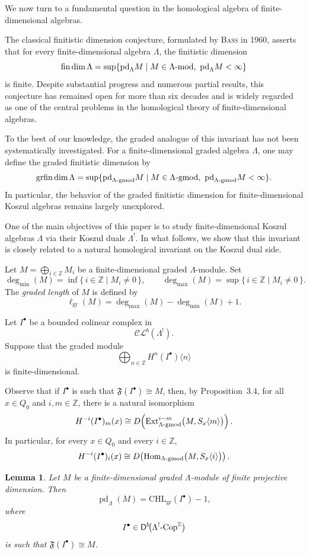 \documentclass[11pt]{article}
\newtheorem{lemma}[theorem]{Lemma}
\theoremstyle{definition}
\theoremstyle{remark}
\begin{document}
We now turn to a fundamental question in the homological algebra of finite-dimensional algebras. 

The classical finitistic dimension conjecture, formulated by \textsc{Bass} in 1960, asserts that for every finite-dimensional algebra \(\Lambda\), the finitistic dimension
\[
\mathrm{fin\,dim}\,\Lambda
=
\sup\{\mathrm{pd}_\Lambda M
\mid
M \in \Lambda\textup{-mod},\ \mathrm{pd}_\Lambda M < \infty\}
\]
is finite. Despite substantial progress and numerous partial results, this conjecture has remained open for more than six decades and is widely regarded as one of the central problems in the homological theory of finite-dimensional algebras.

To the best of our knowledge, the graded analogue of this invariant has not been systematically investigated. For a finite-dimensional graded algebra \(\Lambda\), one may define the graded finitistic dimension by
\[
\mathrm{grfin\,dim}\,\Lambda
=
\sup\{\mathrm{pd}_{\Lambda\textup{-gmod}} M
\mid
M\in \Lambda\textup{-gmod},\ \mathrm{pd}_{\Lambda\textup{-gmod}} M<\infty\}.
\]
In particular, the behavior of the graded finitistic dimension for finite-dimensional Koszul algebras remains largely unexplored.

One of the main objectives of this paper is to study finite-dimensional Koszul algebras \(\Lambda\) via their Koszul duals \(\Lambda^{!}\). In what follows, we show that this invariant is closely related to a natural homological invariant on the Koszul dual side.

\medskip 
Let \(M=\bigoplus_{i\in\mathbb Z} M_i\) be a finite-dimensional graded
\(\Lambda\)-module. Set
\[
\deg_{\min}(M)=\inf\{\, i\in\mathbb Z \mid M_i\neq 0 \,\},
\qquad
\deg_{\max}(M)=\sup\{\, i\in\mathbb Z \mid M_i\neq 0 \,\}.
\]
The \emph{graded length} of \(M\) is defined by
\[
\ell_{\mathrm{gr}}(M)
=
 \deg_{\max}(M)-\deg_{\min}(M) + 1 .
\]

Let \(I^{\bullet}\) be a bounded colinear complex in
\[
\mathcal{CL}^{b}(\Lambda^{!}).
\]
Suppose that the graded module
\[
\bigoplus_{n\in\mathbb Z} H^{n}(I^{\bullet})\langle n\rangle
\]
is finite-dimensional.

Observe that if \(I^{\bullet}\) is such that
\(\mathfrak{F}(I^{\bullet})\cong M\), then, by Proposition~3.4, for all
\(x\in Q_0\) and \(i,m\in\mathbb Z\), there is a natural isomorphism
\[
H^{-i}(I^{\bullet})_m(x)
\cong
D\!\left(
\operatorname{Ext}^{i-m}_{\Lambda\textup{-}\mathrm{gmod}}
\bigl(M,S_x\langle m\rangle\bigr)
\right).
\]
In particular, for every \(x\in Q_0\) and every \(i\in\mathbb Z\),
\[
H^{-i}(I^{\bullet})_i(x)
\cong
D\!\left(
\operatorname{Hom}_{\Lambda\textup{-}\mathrm{gmod}}
\bigl(M,S_x\langle i\rangle\bigr)
\right).
\]
\begin{lemma}
Let \(M\) be a finite-dimensional graded \(\Lambda\)-module of finite
projective dimension. Then
\[
\operatorname{pd}_{\Lambda}(M)
=
\mathrm{CHL}_{\mathrm{gr}}(I^{\bullet})-1,
\]
where
\[
I^{\bullet}\in
\mathsf{D}^{b}\!\bigl(
\Lambda^{!}\textup{-}\mathrm{Cop}^{\mathbb{Z}}
\bigr)
\]
is such that \(\mathfrak{F}(I^{\bullet})\cong M\).
\end{lemma}
\end{document}
